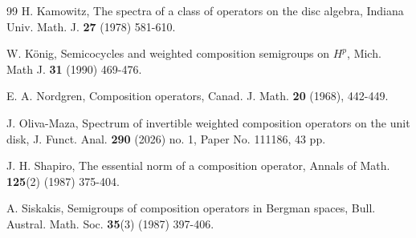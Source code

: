 \documentclass{amsart}
\theoremstyle{proclaim}
\theoremstyle{fancyproclaim}
\theoremstyle{definition}
\theoremstyle{fancystatement}
\numberwithin{equation}{section}
\begin{document}
\begin{thebibliography}{99}
 H. Kamowitz, The spectra of a class of operators on the disc algebra, Indiana Univ. Math. J. \textbf{27} (1978) 581-610. 

 W. K\"onig, Semicocycles and weighted composition semigroups on $H^p$, Mich. Math J. \textbf{31} (1990) 469-476.

 E. A. Nordgren, Composition operators, Canad. J. Math. \textbf{20} (1968), 442-449.

  J. Oliva-Maza, Spectrum of invertible weighted composition operators on the unit disk,  J. Funct. Anal. \textbf{290} (2026) no. 1, Paper No. 111186, 43 pp. 

 J. H. Shapiro, The essential norm of a composition operator, Annals of Math. \textbf{125}(2) (1987) 375-404.

 A. Siskakis, Semigroups of composition operators in Bergman spaces, Bull. Austral. Math. Soc. \textbf{35}(3)  (1987) 397-406.

\end{thebibliography}
\end{document}
